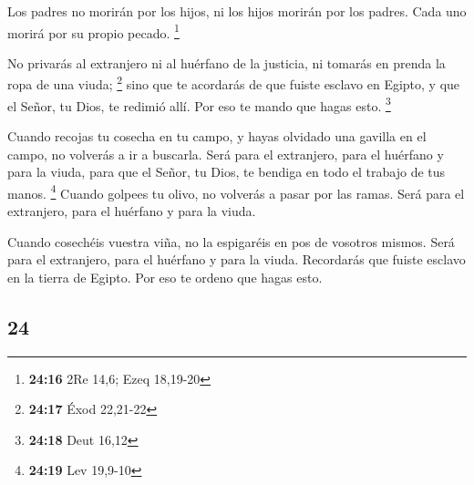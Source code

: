 \begin{paracol}{2}
 Los padres no morirán por los hijos, ni los hijos
morirán por los padres. Cada uno morirá por su propio pecado.
\footnote{\textbf{24:16} 2Re 14,6; Ezeq 18,19-20}

 No privarás al extranjero ni al huérfano de la justicia,
ni tomarás en prenda la ropa de una viuda; \footnote{\textbf{24:17} Éxod
  22,21-22}  sino que te acordarás de que fuiste esclavo
en Egipto, y que el Señor, tu Dios, te redimió allí. Por eso te mando
que hagas esto. \footnote{\textbf{24:18} Deut 16,12}

 Cuando recojas tu cosecha en tu campo, y hayas olvidado
una gavilla en el campo, no volverás a ir a buscarla. Será para el
extranjero, para el huérfano y para la viuda, para que el Señor, tu
Dios, te bendiga en todo el trabajo de tus manos. \footnote{\textbf{24:19}
  Lev 19,9-10}  Cuando golpees tu olivo, no volverás a
pasar por las ramas. Será para el extranjero, para el huérfano y para la
viuda.

 Cuando cosechéis vuestra viña, no la espigaréis en pos
de vosotros mismos. Será para el extranjero, para el huérfano y para la
viuda.  Recordarás que fuiste esclavo en la tierra de
Egipto. Por eso te ordeno que hagas esto.

\switchcolumn
\begin{otherlanguage}{english}

\hypertarget{section-47}{%
\section{24}\label{section-47}}


\end{otherlanguage}
\end{paracol}
